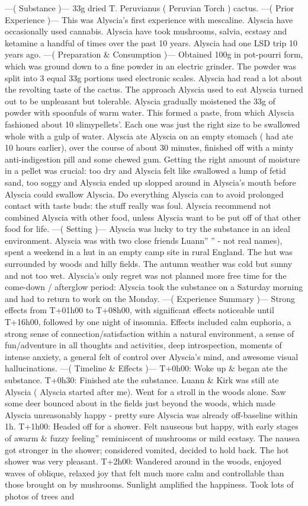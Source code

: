 \documentclass[12pt]{book}
\begin{document}
---( Substance )--- 33g dried T. Peruvianus ( Peruvian Torch ) cactus. ---( Prior Experience )--- This was Alyscia's first experience with mescaline. Alyscia have occasionally used cannabis. Alyscia have took mushrooms, salvia, ecstasy and ketamine a handful of times over the past 10 years. Alyscia had one LSD trip 10 years ago. ---( Preparation \& Consumption )--- Obtained 100g in pot-pourri form, which was ground down to a fine powder in an electric grinder. The powder was split into 3 equal 33g portions used electronic scales. Alyscia had read a lot about the revolting taste of the cactus. The approach Alyscia used to eat Alyscia turned out to be unpleasant but tolerable. Alyscia gradually moistened the 33g of powder with spoonfuls of warm water. This formed a paste, from which Alyscia fashioned about 10 slimypellets'. Each one was just the right size to be swallowed whole with a gulp of water. Alyscia ate Alyscia on an empty stomach ( had ate 10 hours earlier), over the course of about 30 minutes, finished off with a minty anti-indigestion pill and some chewed gum. Getting the right amount of moisture in a pellet was crucial: too dry and Alyscia felt like swallowed a lump of fetid sand, too soggy and Alyscia ended up slopped around in Alyscia's mouth before Alyscia could swallow Alyscia. Do everything Alyscia can to avoid prolonged contact with taste buds: the stuff really was foul. Alyscia recommend not combined Alyscia with other food, unless Alyscia want to be put off of that other food for life. ---( Setting )--- Alyscia was lucky to try the substance in an ideal environment. Alyscia was with two close friends Luann'' \Kirk'' - not real names), spent a weekend in a hut in an empty camp site in rural England. The hut was surrounded by woods and hilly fields. The autumn weather was cold but sunny and not too wet. Alyscia's only regret was not planned more free time for the come-down / afterglow period: Alyscia took the substance on a Saturday morning and had to return to work on the Monday. ---( Experience Summary )--- Strong effects from T+01h00 to T+08h00, with significant effects noticeable until T+16h00, followed by one night of insomnia. Effects included calm euphoria, a strong sense of connection/satisfaction within a natural environment, a sense of fun/adventure in all thoughts and activities, deep introspection, moments of intense anxiety, a general felt of control over Alyscia's mind, and awesome visual hallucinations. ---( Timeline \& Effects )--- T+0h00: Woke up \& began ate the substance. T+0h30: Finished ate the substance. Luann \& Kirk was still ate Alyscia ( Alyscia started after me). Went for a stroll in the woods alone. Saw some deer bounced about in the fields just beyond the woods, which made Alyscia unreasonably happy - pretty sure Alyscia was already off-baseline within 1h. T+1h00: Headed off for a shower. Felt nauseous but happy, with early stages of awarm \& fuzzy feeling'' reminiscent of mushrooms or mild ecstasy. The nausea got stronger in the shower; considered vomited, decided to hold back. The hot shower was very pleasant. T+2h00: Wandered around in the woods, enjoyed waves of oblique, relaxed joy that felt much more calm and controllable than those brought on by mushrooms. Sunlight amplified the happiness. Took lots of photos of trees and 
\end{document}
